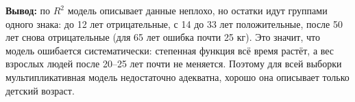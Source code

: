 \documentclass{article}
\begin{document}
    \textbf{Вывод:} по $R^2$ модель описывает данные неплохо, но остатки идут группами одного знака: до 12 лет отрицательные, с 14 до 33 лет положительные, после 50 лет снова отрицательные (для 65 лет ошибка почти 25 кг). Это значит, что модель ошибается систематически: степенная функция всё время растёт, а вес взрослых людей после 20--25 лет почти не меняется. Поэтому для всей выборки мультипликативная модель недостаточно адекватна, хорошо она описывает только детский возраст.
\end{document}
